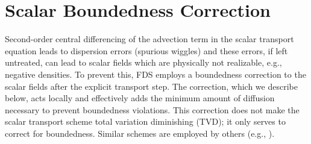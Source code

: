 %



\chapter{Scalar Boundedness Correction}
\label{app_boundedness}

Second-order central differencing of the advection term in the scalar transport equation leads to dispersion errors (spurious wiggles) and these errors, if left untreated, can lead to scalar fields which are physically not realizable, e.g., negative densities.  To prevent this, FDS employs a boundedness correction to the scalar fields after the explicit transport step.  The correction, which we describe below, acts locally and effectively adds the minimum amount of diffusion necessary to prevent boundedness violations.  This correction does not make the scalar transport scheme total variation diminishing (TVD); it only serves to correct for boundedness. Similar schemes are employed by others (e.g., \cite{Herrmann:2005}).

